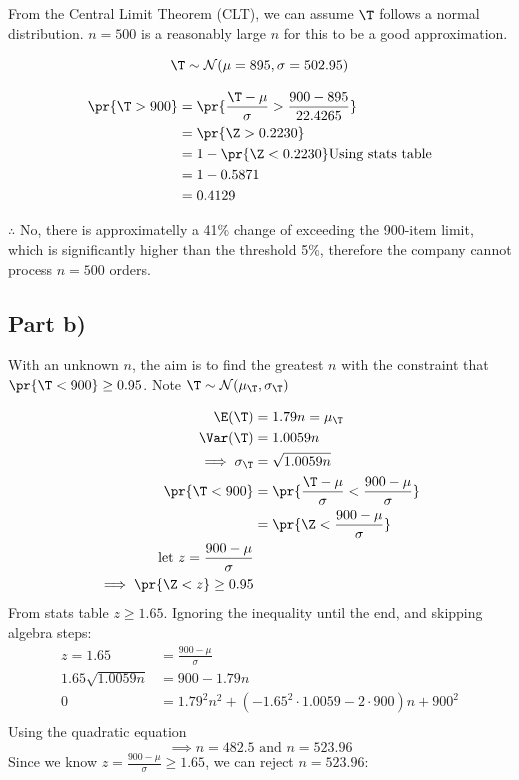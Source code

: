 From the Central Limit Theorem (CLT), we can assume $\T$ follows a normal distribution.
$n = 500$ is a reasonably large $n$ for this to be a good approximation.

\[
\T \sim \mathcal{N}(\mu = 895, \sigma = 502.95)
\]

\begin{align*}
\pr{\T > 900} &= \pr{\frac{\T - \mu}{\sigma} > \frac{900 - 895}{22.4265}} \\
&= \pr{\Z > 0.2230} \\
&= 1 - \pr{\Z < 0.2230}
\text{Using stats table} \\
&= 1 - 0.5871 \\
&= 0.4129
\end{align*}

$\therefore$ No, there is approximatelly a 41\% change of exceeding the 900-item limit,
which is significantly higher than the threshold 5\%, therefore the company cannot process
$n = 500$ orders.

\subsection{Part b)}

With an unknown $n$, the aim is to find the greatest $n$ with the constraint that
$\pr{\T < 900} \geq 0.95$.
Note $\T \sim \mathcal{N}(\mu_\T, \sigma_\T)$

\begin{align*}
\E(\T) &= 1.79n = \mu_\T \\
\Var(\T) &= 1.0059n \\
\implies \sigma _\T &= \sqrt{1.0059n} \\
\pr{\T < 900} &= \pr{\frac{\T - \mu}{\sigma} < \frac{900 - \mu}{\sigma}} \\
&= \pr{\Z < \frac{900 - \mu}{\sigma}} \\
\text{let } z = \frac{900 - \mu}{\sigma} \\
\implies \pr{\Z < z} \geq 0.95 \\
\end{align*}
From stats table $z \geq 1.65$.
Ignoring the inequality until the end, and skipping algebra steps:
\begin{align*}
z = 1.65 &= \frac{900 - \mu}{\sigma} \\
1.65 \sqrt{1.0059n} &= 900 - 1.79n \\
0 &= 1.79^2n^2 + (-1.65^2 \cdot 1.0059 - 2\cdot 900)n + 900^2 \\
\end{align*}
Using the quadratic equation
\[
\implies n = 482.5 \text{ and } n = 523.96
\]
Since we know $z = \frac{900 - \mu}{\sigma} \geq 1.65$, we can reject $n = 523.96$:

